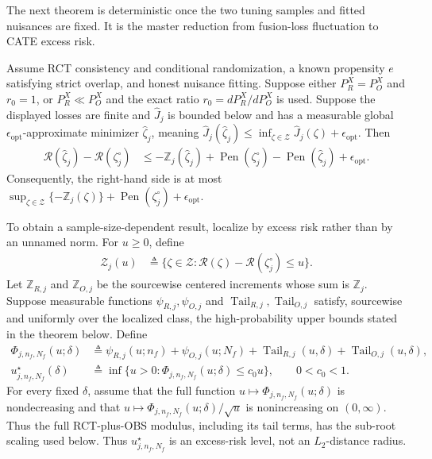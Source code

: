 The next theorem is deterministic once the two tuning samples and fitted
nuisances are fixed.  It is the master reduction from fusion-loss fluctuation
to CATE excess risk.
\begin{theorem}
\label{thm:cate-general-erm}
Assume RCT consistency and conditional randomization, a known propensity
$e$ satisfying strict overlap, and honest nuisance fitting.  Suppose either
$P_R^X=P_O^X$ and $r_0=1$, or $P_R^X\ll P_O^X$ and the exact ratio
$r_0=dP_R^X/dP_O^X$ is used.  Suppose the displayed losses are finite and
$\widehat J_j$ is bounded below and has a measurable global
$\epsilon_{\mathrm{opt}}$-approximate minimizer $\widehat\zeta_j$, meaning
$\widehat J_j(\widehat\zeta_j)\leq
\inf_{\zeta\in\mathcal Z}\widehat J_j(\zeta)+\epsilon_{\mathrm{opt}}$. Then
\begin{align}
\mathcal R(\widehat\zeta_j)-\mathcal R(\zeta_j^\circ)
&\leq-\mathbb Z_j(\widehat\zeta_j)
+\operatorname{Pen}(\zeta_j^\circ)
-\operatorname{Pen}(\widehat\zeta_j)
+\epsilon_{\mathrm{opt}}.
\label{eq:cate-general-erm-exact}
\end{align}
Consequently, the right-hand side is at most
$\sup_{\zeta\in\mathcal Z}\{-\mathbb Z_j(\zeta)\}
+\operatorname{Pen}(\zeta_j^\circ)+\epsilon_{\mathrm{opt}}$.
\end{theorem}

To obtain a sample-size-dependent result, localize by excess risk rather than
by an unnamed norm.  For $u\geq0$, define
\begin{align*}
\mathcal Z_j(u)
&\triangleq\{\zeta\in\mathcal Z:
\mathcal R(\zeta)-\mathcal R(\zeta_j^\circ)\leq u\}.
\end{align*}
Let $\mathbb Z_{R,j}$ and $\mathbb Z_{O,j}$ be the sourcewise centered
increments whose sum is $\mathbb Z_j$.  Suppose measurable functions
$\psi_{R,j},\psi_{O,j}$ and $\operatorname{Tail}_{R,j},
\operatorname{Tail}_{O,j}$ satisfy, sourcewise and uniformly over the
localized class, the high-probability upper bounds stated in the theorem
below. Define
\begin{align*}
\Phi_{j,n_f,N_f}(u;\delta)
&\triangleq
\psi_{R,j}(u;n_f)+\psi_{O,j}(u;N_f)
+\operatorname{Tail}_{R,j}(u,\delta)
+\operatorname{Tail}_{O,j}(u,\delta),\\
u_{j,n_f,N_f}^\star(\delta)
&\triangleq
\inf\{u>0:\Phi_{j,n_f,N_f}(u;\delta)\leq c_0u\},
\qquad 0<c_0<1.
\end{align*}
For every fixed $\delta$, assume that the full function
$u\mapsto\Phi_{j,n_f,N_f}(u;\delta)$ is nondecreasing and that
$u\mapsto\Phi_{j,n_f,N_f}(u;\delta)/\sqrt{u}$ is nonincreasing on
$(0,\infty)$. Thus the full RCT-plus-OBS modulus, including its tail
terms, has the sub-root scaling used below.
Thus $u_{j,n_f,N_f}^\star$ is an excess-risk level, not an
$L_2$-distance radius.

